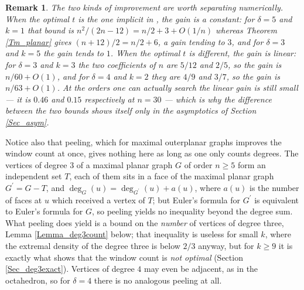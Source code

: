 \documentclass[12pt,a4paper]{article}%
\newtheorem{remark}[theorem]{Remark}
\begin{document}
\begin{remark}
\label{Rem_clz}The two kinds of improvement are worth separating numerically.
When the optimal $t$ is the one implicit in \cite{CaroLauriZarb}, the gain is a
constant: for $\delta =5$ and $k=1$ that bound is $n^{2}/(2n-12)=n/2+3+O(1/n)$
whereas Theorem \ref{Tm_planar} gives $(n+12)/2=n/2+6$, a gain tending to $3$,
and for $\delta =3$ and $k=5$ the gain tends to $1$. When the optimal $t$ is
different, the gain is linear: for $\delta =3$ and $k=3$ the two coefficients of
$n$ are $5/12$ and $2/5$, so the gain is $n/60+O(1)$, and for $\delta =4$ and
$k=2$ they are $4/9$ and $3/7$, so the gain is $n/63+O(1)$. At the orders one
can actually search the linear gain is still small --- it is $0.46$ and $0.15$
respectively at $n=30$ --- which is why the difference between the two bounds
shows itself only in the asymptotics of Section \ref{Sec_asym}.
\end{remark}



Notice also that peeling, which for maximal outerplanar graphs improves the window count at once, gives nothing here
as long as one only counts degrees. The vertices of degree $3$ of a maximal planar graph $G$ of order $n\geq 5$
form an independent set $T$, each of them sits in a face of the maximal planar graph $G^{\prime }=G-T$, and
$\deg _{G}(u)=\deg _{G^{\prime }}(u)+a(u)$, where $a(u)$ is the number of faces at $u$ which received a
vertex of $T$; but Euler's formula for $G^{\prime }$ is equivalent to Euler's formula for $G$, so
peeling yields no inequality beyond the degree sum. What peeling does yield is a bound on the \emph{number} of
vertices of degree three, Lemma \ref{Lemma_deg3count} below; that inequality is useless for small $k$, where
the extremal density of the degree three is below $2/3$ anyway, but for $k\geq 9$ it is exactly what shows
that the window count is \emph{not optimal} (Section \ref{Sec_deg3exact}). Vertices of degree $4$ may even be
adjacent, as in the octahedron, so for $\delta =4$ there is no analogous peeling at all.
\end{document}
